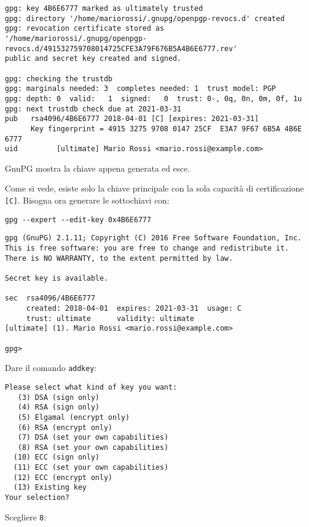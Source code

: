 \documentclass[a4paper,10pt]{article}
\begin{document}
\begin{verbatim}
gpg: key 4B6E6777 marked as ultimately trusted
gpg: directory '/home/mariorossi/.gnupg/openpgp-revocs.d' created
gpg: revocation certificate stored as '/home/mariorossi/.gnupg/openpgp-revocs.d/491532759708014725CFE3A79F676B5A4B6E6777.rev'
public and secret key created and signed.

gpg: checking the trustdb
gpg: marginals needed: 3  completes needed: 1  trust model: PGP
gpg: depth: 0  valid:   1  signed:   0  trust: 0-, 0q, 0n, 0m, 0f, 1u
gpg: next trustdb check due at 2021-03-31
pub   rsa4096/4B6E6777 2018-04-01 [C] [expires: 2021-03-31]
      Key fingerprint = 4915 3275 9708 0147 25CF  E3A7 9F67 6B5A 4B6E 6777
uid         [ultimate] Mario Rossi <mario.rossi@example.com>
\end{verbatim}

GnuPG mostra la chiave appena generata ed esce.

Come si vede, esiste solo la chiave principale con la sola capacità di certificazione \texttt{[C]}.
Bisogna ora generare le sottochiavi con:

\begin{verbatim}
gpg --expert --edit-key 0x4B6E6777
\end{verbatim}


\begin{verbatim}
gpg (GnuPG) 2.1.11; Copyright (C) 2016 Free Software Foundation, Inc.
This is free software: you are free to change and redistribute it.
There is NO WARRANTY, to the extent permitted by law.

Secret key is available.

sec  rsa4096/4B6E6777
     created: 2018-04-01  expires: 2021-03-31  usage: C
     trust: ultimate      validity: ultimate
[ultimate] (1). Mario Rossi <mario.rossi@example.com>

gpg>
\end{verbatim}

Dare il comando \texttt{addkey}:

\begin{verbatim}
Please select what kind of key you want:
   (3) DSA (sign only)
   (4) RSA (sign only)
   (5) Elgamal (encrypt only)
   (6) RSA (encrypt only)
   (7) DSA (set your own capabilities)
   (8) RSA (set your own capabilities)
  (10) ECC (sign only)
  (11) ECC (set your own capabilities)
  (12) ECC (encrypt only)
  (13) Existing key
Your selection?
\end{verbatim}

Scegliere \texttt{8}:
\end{document}
